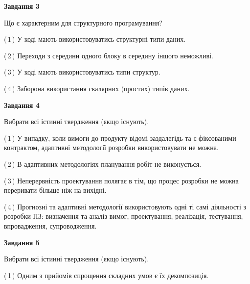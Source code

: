 \documentclass[10pt, ukrainian]{article}
\begin{document}
{\begin {large}
{\begin {center}\textbf{Завдання 3}\end {center}}\par
Що є характерним для структурного програмування?\par
\vspace{2mm}



(\,1\,) У коді мають використовуватись структурні типи даних. %



(\,2\,) Переходи з середини одного блоку в середину іншого неможливі. %



(\,3\,) У коді мають використовуватись типи структур. %



(\,4\,) Заборона використання скалярних (простих) типів даних. %


{\begin {center}\textbf{Завдання 4}\end {center}}\par
Вибрати всі істинні твердження (якщо існують).\par
\vspace{2mm}



(\,1\,) У випадку, коли вимоги до продукту відомі заздалегідь та є фіксованими контрактом, адаптивні методології розробки використовувати не можна. %



(\,2\,) В адаптивних методологіях планування робіт не виконується. %



(\,3\,) Неперервність проектування полягає в тім, що процес розробки не можна переривати більше ніж на вихідні. %



(\,4\,) Прогнозні та адаптивні методології використовують одні ті самі діяльності з розробки ПЗ: визначення та аналіз вимог, проектування, реалізація, тестування, впровадження, супроводження. %


{\begin {center}\textbf{Завдання 5}\end {center}}\par
Вибрати всі істинні твердження (якщо існують).\par
\vspace{2mm}



(\,1\,) Одним з прийомів спрощення складних умов є їх декомпозиція. %




\end{large}}
\end{document}
